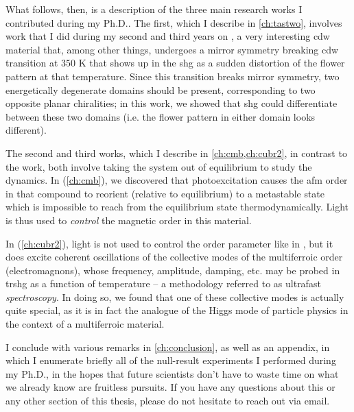 What follows, then, is a description of the three main research works I contributed during my Ph.D..
The first, which I describe in \cref{ch:tastwo}, involves work that I did during my second and third years on \tastwo, a very interesting \gls{cdw} material that, among other things, undergoes a mirror symmetry breaking \gls{cdw} transition at $350$ \si{K} that shows up in the \gls{shg} as a sudden distortion of the flower pattern at that temperature.
Since this transition breaks mirror symmetry, two energetically degenerate domains should be present, corresponding to two opposite planar chiralities; in this work, we showed that \gls{shg} could differentiate between these two domains (i.e. the flower pattern in either domain looks different).

The second and third works, which I describe in \cref{ch:cmb,ch:cubr2}, in contrast to the \tastwo work, both involve taking the system out of equilibrium to study the dynamics.
In  (\cref{ch:cmb}), we discovered that photoexcitation causes the \gls{afm} order in that compound to reorient (relative to equilibrium) to a metastable state which is impossible to reach from the equilibrium state thermodynamically.
Light is thus used to \textit{control} the magnetic order in this material.

In  (\cref{ch:cubr2}), light is not used to control the order parameter like in , but it does excite coherent oscillations of the collective modes of the multiferroic order (electromagnons), whose frequency, amplitude, damping, etc. may be probed in \gls{trshg} as a function of temperature -- a methodology referred to as ultrafast \textit{spectroscopy}.
In doing so, we found that one of these collective modes is actually quite special, as it is in fact the analogue of the Higgs mode of particle physics in the context of a multiferroic material.

I conclude with various remarks in \cref{ch:conclusion}, as well as an appendix, in which I enumerate briefly all of the null-result experiments I performed during my Ph.D., in the hopes that future scientists don't have to waste time on what we already know are fruitless pursuits.
If you have any questions about this or any other section of this thesis, please do not hesitate to reach out via email.
